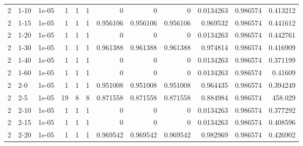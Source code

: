 \begin{tabular}{rlrrrrrrrrrr}
     2 & 1-10   &      1e-05 &           1 &                 1 &                 1 &     0           &     0           &      0           &        0.0134263 &               0.986574 &           0.413212 \\
     2 & 1-15   &      1e-05 &           1 &                 1 &                 1 &     0.956106    &     0.956106    &      0.956106    &        0.969532  &               0.986574 &           0.441612 \\
     2 & 1-20   &      1e-05 &           1 &                 1 &                 1 &     0           &     0           &      0           &        0.0134263 &               0.986574 &           0.442761 \\
     2 & 1-30   &      1e-05 &           1 &                 1 &                 1 &     0.961388    &     0.961388    &      0.961388    &        0.974814  &               0.986574 &           0.416909 \\
     2 & 1-40   &      1e-05 &           1 &                 1 &                 1 &     0           &     0           &      0           &        0.0134263 &               0.986574 &           0.371199 \\
     2 & 1-60   &      1e-05 &           1 &                 1 &                 1 &     0           &     0           &      0           &        0.0134263 &               0.986574 &           0.41609  \\
     2 & 2-0    &      1e-05 &           1 &                 1 &                 1 &     0.951008    &     0.951008    &      0.951008    &        0.964435  &               0.986574 &           0.394249 \\
     2 & 2-5    &      1e-05 &          19 &                 8 &                 8 &     0.871558    &     0.871558    &      0.871558    &        0.884984  &               0.986574 &         458.029    \\
     2 & 2-10   &      1e-05 &           1 &                 1 &                 1 &     0           &     0           &      0           &        0.0134263 &               0.986574 &           0.377292 \\
     2 & 2-15   &      1e-05 &           1 &                 1 &                 1 &     0           &     0           &      0           &        0.0134263 &               0.986574 &           0.408596 \\
     2 & 2-20   &      1e-05 &           1 &                 1 &                 1 &     0.969542    &     0.969542    &      0.969542    &        0.982969  &               0.986574 &           0.426902 \\

\end{tabular}
